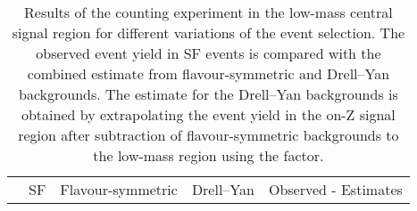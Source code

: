 
\begin{table}[hbtp]
 \renewcommand{\arraystretch}{1.3}
 \setlength{\belowcaptionskip}{6pt}
 \scriptsize
 \centering
 \caption{Results of the counting experiment in the low-mass central signal region for different variations of the event selection. The observed event yield in SF events is compared with the combined estimate from flavour-symmetric and Drell--Yan backgrounds. The estimate for the Drell--Yan backgrounds is obtained by extrapolating the event yield in the on-Z signal region after subtraction of flavour-symmetric backgrounds to the low-mass region using the \Routin factor.}
  \label{tab:CountingCrosschecks}
  \begin{tabular}{l|c|c|c|c}
                                &  SF        & Flavour-symmetric  &  Drell--Yan  & Observed - Estimates \\ 


\end{tabular}
\end{table}
